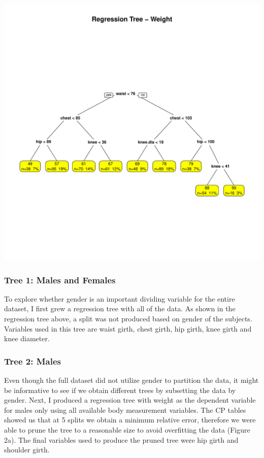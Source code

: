 \documentclass[11pt]{article}\usepackage[]{graphicx}\usepackage[]{color}
\makeatletter
\def\maxwidth{ %
  \ifdim\Gin@nat@width>\linewidth
    \linewidth
  \else
    \Gin@nat@width
  \fi
}
\newenvironment{knitrout}{}{} %
\makeatother
\begin{document}
\begin{knitrout}
\color{fgcolor}
\includegraphics[width=\maxwidth]{figure/wt} 

\end{knitrout}


\subsubsection{Tree 1: Males and Females} 
To explore whether gender is an important dividing variable for the entire dataset, I first grew a regression tree with all of the data. As shown in the regression tree above, a split was not produced based on gender of the subjects. Variables used in this tree are waist girth, chest girth, hip girth, knee girth and knee diameter. \\

\pagebreak

\subsubsection{Tree 2: Males} 
Even though the full dataset did not utilize gender to partition the data, it might be informative to see if we obtain different trees by subsetting the data by gender. Next, I produced a regression tree with weight as the dependent variable for males only using all available body measurement variables. The CP tables showed us that at 5 splits we obtain a minimum relative error, therefore we were able to prune the tree to a reasonable size to avoid overfitting the data (Figure 2a). The final variables used to produce the pruned tree were hip girth and shoulder girth.
\end{document}
